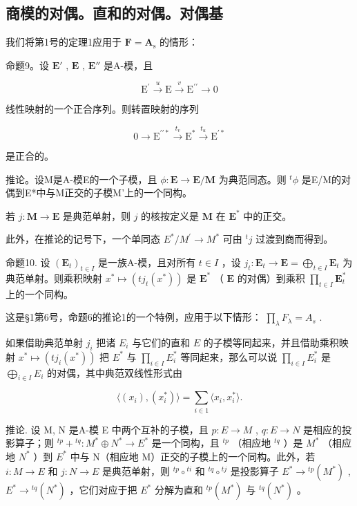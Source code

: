 \subsection{商模的对偶。直和的对偶。对偶基}

我们将第1号的定理1应用于 \(\mathbf{F} = \mathbf{A}_{\mathrm{s}}\) 的情形：

命题9。设 \(\mathbf{E}'\) , \(\mathbf{E}\) , \(\mathbf{E}''\) 是A-模，且

\[
\mathrm{E} ^ {\prime} \stackrel {u} {\longrightarrow} \mathrm{E} \stackrel {v} {\longrightarrow} \mathrm{E} ^ {\prime \prime} \longrightarrow 0\tag{21}
\]

线性映射的一个正合序列。则转置映射的序列

\[
0 \longrightarrow \mathrm{E} ^ {\prime \prime *} \stackrel {t _ {v}} {\longrightarrow} \mathrm{E} ^ {*} \stackrel {t _ {u}} {\longrightarrow} \mathrm{E} ^ {\prime *} \tag {1}
\]

是正合的。

推论。设M是A-模E的一个子模，且 \(\phi: \mathbf{E} \to \mathbf{E} / \mathbf{M}\) 为典范同态。则 \(^t\phi\) 是E/M的对偶到E*中与M正交的子模M'上的一个同构。

若 \(j: \mathbf{M} \to \mathbf{E}\) 是典范单射，则 \(j\) 的核按定义是 \(\mathbf{M}\) 在 \(\mathbf{E}^*\) 中的正交。

此外，在推论的记号下，一个单同态 \(E^{*}/M^{\prime} \rightarrow M^{*}\) 可由 \(^{t}j\) 过渡到商而得到。

命题10. 设 \((\mathbf{E}_t)_{t \in I}\) 是一族A-模，且对所有 \(t \in I\) ，设 \(j_t: \mathbf{E}_t \to \mathbf{E} = \bigoplus_{t \in I} \mathbf{E}_t\) 为典范单射。则乘积映射 \(x^* \mapsto (t j_t(x^*))\) 是 \(\mathbf{E}^*\) （ \(\mathbf{E}\) 的对偶）到乘积 \(\prod_{t \in I} \mathbf{E}_t^*\) 上的一个同构。

这是§1第6号，命题6的推论1的一个特例，应用于以下情形： \(\prod_{\lambda} F_{\lambda} = A_{s}\) .

如果借助典范单射 \(j_{i}\) 把诸 \(E_{i}\) 与它们的直和 \(E\) 的子模等同起来，并且借助乘积映射 \(x^{*} \mapsto (t j_{i}(x^{*}))\) 把 \(E^{*}\) 与 \(\prod_{i \in I} E_{i}^{*}\) 等同起来，那么可以说 \(\prod_{i \in I} E_{i}^{*}\) 是 \(\bigoplus_{i \in I} E_{i}\) 的对偶，其中典范双线性形式由

\[
\langle (x _ {i}), (x _ {i} ^ {*}) \rangle = \sum_ {i \in 1} \langle x _ {i}, x _ {i} ^ {*} \rangle .\tag{22}
\]

推论. 设 M, N 是A-模 E 中两个互补的子模，且 \(p:E\to M\) , \(q:E\to N\) 是相应的投影算子；则 \({}^{tp}+{}^{tq}:M^{*}\oplus N^{*}\to E^{*}\) 是一个同构，且 \({}^{tp}\) （相应地 \({}^{tq}\) ）是 \(M^{*}\) （相应地 \(N^{*}\) ）到 \(E^{*}\) 中与 N（相应地 M）正交的子模上的一个同构。此外，若 \(i:M\to E\) 和 \(j:N\to E\) 是典范单射，则 \({}^{tp}\circ{}^{ti}\) 和 \({}^{tq}\circ{}^{tj}\) 是投影算子 \(E^{*}\to{}^{tp}(M^{*})\) , \(E^{*}\to{}^{tq}(N^{*})\) ，它们对应于把 \(E^{*}\) 分解为直和 \({}^{tp}(M^{*})\) 与 \({}^{tq}(N^{*})\) 。

